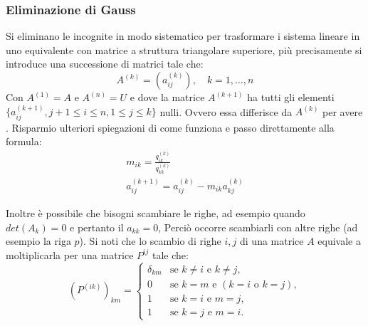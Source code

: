 
\subsubsection{Eliminazione di Gauss}

Si eliminano le incognite in modo sistematico per trasformare i sistema lineare in uno equivalente con matrice a struttura triangolare superiore, più precisamente si introduce una successione di matrici tale che:
\[
            A^{(k)} = (a_{ij}^{(k)}), \quad k = 1,\dots,n
\]
Con $A^{(1)} = A$ e $A^{(n)} = U$ e dove la matrice $A^{(k+1)}$ ha tutti gli elementi $\{a_{ij}^{(k+1)}, j+1 \leq i\leq n, 1\leq j \leq k\}$ nulli. Ovvero essa differisce da $A^{(k)}$ per avere . Risparmio ulteriori spiegazioni di come funziona e passo direttamente alla formula:
\[
    \begin{array}{l}
        m_{ik} = \frac{q_{ik} ^ {(k)}}{q_{kk} ^ {(k)}} \\
        a_{ij}^{(k+1)} = a_{ij}^{(k)} - m_{ik} a_{kj} ^ {(k)}
    \end{array}
\]

Inoltre è possibile che bisogni scambiare le righe, ad esempio quando $det(A_k) = 0$ e pertanto il $a_{kk} = 0$, Perciò occorre scambiarli con altre righe (ad esempio la riga $p$). Si noti che lo scambio di righe $i,j$ di una matrice $A$ equivale a moltiplicarla per una matrice $P^{ij}$ tale che:
\[
    (P^{(ik)})_{km} =
        \begin{cases} 
            \delta_{km} & \text{se } k \neq i \text{ e } k \neq j, \\ 
            0 & \text{se } k = m \text{ e } (k = i \text{ o } k = j), \\ 
            1 & \text{se } k = i \text{ e } m = j, \\ 
            1 & \text{se } k = j \text{ e } m = i.
        \end{cases}
\]


